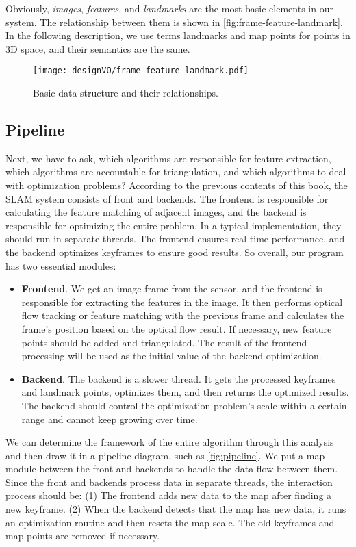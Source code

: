 Obviously, \textit{images}, \textit{features}, and \textit{landmarks} are the most basic elements in our system. The relationship between them is shown in \autoref{fig:frame-feature-landmark}. In the following description, we use terms landmarks and map points for points in 3D space, and their semantics are the same.

\begin{figure}[!htp]
	\centering
	\texttt{[image: designVO/frame-feature-landmark.pdf]}
	\caption{Basic data structure and their relationships.}
	\label{fig:frame-feature-landmark}
\end{figure}

\subsection{Pipeline}
Next, we have to ask, which algorithms are responsible for feature extraction, which algorithms are accountable for triangulation, and which algorithms to deal with optimization problems? According to the previous contents of this book, the SLAM system consists of front and backends. The frontend is responsible for calculating the feature matching of adjacent images, and the backend is responsible for optimizing the entire problem. In a typical implementation, they should run in separate threads. The frontend ensures real-time performance, and the backend optimizes keyframes to ensure good results. So overall, our program has two essential modules:

\begin{itemize}
	\item \textbf{Frontend}. We get an image frame from the sensor, and the frontend is responsible for extracting the features in the image. It then performs optical flow tracking or feature matching with the previous frame and calculates the frame's position based on the optical flow result. If necessary, new feature points should be added and triangulated. The result of the frontend processing will be used as the initial value of the backend optimization.
	\item \textbf{Backend}. The backend is a slower thread. It gets the processed keyframes and landmark points, optimizes them, and then returns the optimized results. The backend should control the optimization problem's scale within a certain range and cannot keep growing over time.
\end{itemize}

We can determine the framework of the entire algorithm through this analysis and then draw it in a pipeline diagram, such as \autoref{fig:pipeline}. We put a map module between the front and backends to handle the data flow between them. Since the front and backends process data in separate threads, the interaction process should be: (1) The frontend adds new data to the map after finding a new keyframe. (2) When the backend detects that the map has new data, it runs an optimization routine and then resets the map scale. The old keyframes and map points are removed if necessary.

